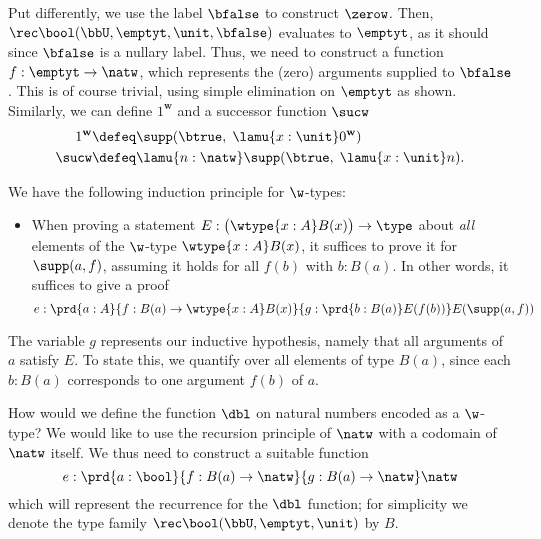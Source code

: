 Put differently, we use the label $\bfalse$ to construct $\zerow$. Then, $\rec\bool(\bbU,\emptyt,\unit, \bfalse)$ evaluates to $\emptyt$, as it should since $\bfalse$ is a nullary label. Thus, we need to construct a function $f : \emptyt \to \natw$, which represents the (zero) arguments supplied to $\bfalse$. This is of course trivial, using simple elimination on $\emptyt$ as shown. Similarly, we can define $1^{\mathbf{w}}$ and a successor function $\sucw$
\begin{align*}
1^{\mathbf{w}} &\defeq \supp(\btrue, \; \lamu{x:\unit} 0^{\mathbf{w}}) \\
\sucw&\defeq \lamu{n:\natw} \supp(\btrue, \; \lamu{x:\unit} n).
\end{align*}


%
We have the following induction principle for $\w$-types:
\begin{itemize}
\item When proving a statement $E : \big(\wtype{x:A} B(x)\big) \to \type$ about \emph{all} elements of the $\w$-type $\wtype{x:A} B(x)$, it suffices to prove it for $\supp(a,f)$, assuming it holds for all $f(b)$ with $b : B(a)$.
In other words, it suffices to give a proof
\begin{equation*}
e : \prd{a:A}{f : B(a) \to \wtype{x:A} B(x)}{g : \prd{b : B(a)} E(f(b))} E(\supp(a,f))
\end{equation*}
\end{itemize}

%
The variable $g$ represents our inductive hypothesis, namely that all arguments of $a$ satisfy $E$. To state this, we quantify over all elements of type $B(a)$, since each $b : B(a)$ corresponds to one argument $f(b)$ of $a$.

How would we define the function $\dbl$ on natural numbers encoded as a $\w$-type? We would like to use the recursion principle of $\natw$ with a codomain of $\natw$ itself. We thus need to construct a suitable function
\[e : \prd{a : \bool}{f : B(a) \to \natw}{g : B(a) \to \natw} \natw\]
which will represent the recurrence for the $\dbl$ function; for simplicity we denote the type family $\rec\bool(\bbU,\emptyt,\unit)$ by $B$.

